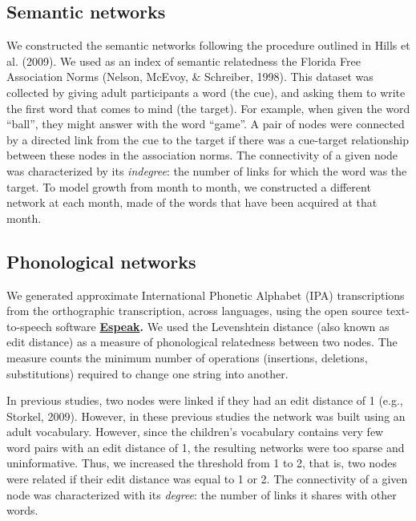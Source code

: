 \documentclass[10pt, letterpaper]{article}
\begin{document}
\subsection{Semantic networks}\label{semantic-networks}

We constructed the semantic networks following the procedure outlined in
Hills et al. (2009). We used as an index of semantic relatedness the
Florida Free Association Norms (Nelson, McEvoy, \& Schreiber, 1998).
This dataset was collected by giving adult participants a word (the
cue), and asking them to write the first word that comes to mind (the
target). For example, when given the word ``ball'', they might answer
with the word ``game''. A pair of nodes were connected by a directed
link from the cue to the target if there was a cue-target relationship
between these nodes in the association norms. The connectivity of a
given node was characterized by its \emph{indegree}: the number of links
for which the word was the target. To model growth from month to month,
we constructed a different network at each month, made of the words that
have been acquired at that month.

\subsection{Phonological networks}\label{phonological-networks}

We generated approximate International Phonetic Alphabet (IPA)
transcriptions from the orthographic transcription, across languages,
using the open source text-to-speech software
\textbf{\href{http://http://espeak.sourceforge.net/}{Espeak}.} We used
the Levenshtein distance (also known as edit distance) as a measure of
phonological relatedness between two nodes. The measure counts the
minimum number of operations (insertions, deletions, substitutions)
required to change one string into another.

In previous studies, two nodes were linked if they had an edit distance
of 1 (e.g., Storkel, 2009). However, in these previous studies the
network was built using an adult vocabulary. However, since the
children's vocabulary contains very few word pairs with an edit distance
of 1, the resulting networks were too sparse and uninformative. Thus, we
increased the threshold from 1 to 2, that is, two nodes were related if
their edit distance was equal to 1 or 2. The connectivity of a given
node was characterized with its \emph{degree}: the number of links it
shares with other words.
\end{document}

